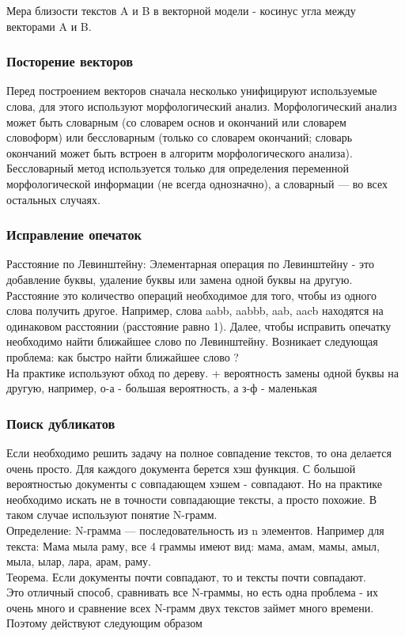 Мера близости текстов A и B в векторной модели - косинус угла между векторами A и B.

\subsubsection {Посторение векторов}
Перед построением векторов сначала несколько унифицируют используемые слова, для этого используют морфологический анализ.
Морфологический анализ может быть словарным (со словарем основ и окончаний или словарем словоформ) или бессловарным (только со словарем окончаний; словарь окончаний может быть встроен в алгоритм морфологического анализа). Бессловарный метод используется только для определения переменной морфологической информации (не всегда однозначно), а словарный — во всех остальных случаях. 

\subsubsection {Исправление опечаток}
Расстояние по Левинштейну:
Элементарная операция по Левинштейну - это добавление буквы, удаление буквы или замена одной буквы на другую. Расстояние это количество операций необходимое для того, чтобы из одного слова получить другое. Например, слова aabb, aabbb, aab, aacb находятся на одинаковом расстоянии (расстояние равно 1). Далее, чтобы исправить опечатку необходимо найти ближайшее слово по Левинштейну. 
Возникает следующая проблема: как быстро найти ближайшее слово ? \\
На практике используют обход по дереву. + вероятность замены одной буквы на другую, например, о-а - большая вероятность, а з-ф - маленькая

\subsubsection {Поиск дубликатов}
Если необходимо решить задачу на полное совпадение текстов, то она делается очень просто. Для каждого документа берется хэш функция. С большой вероятностью документы с совпадающем хэшем - совпадают. Но на практике необходимо искать не в точности совпадающие тексты, а просто похожие. В таком случае используют понятие N-грамм.  \\
Определение: N-грамма — последовательность из n элементов. Например для текста: Мама мыла раму, все 4 граммы имеют вид: мама, амам, мамы, амыл, мыла, ылар, лара, арам, раму.  \\
Теорема. Если документы почти совпадают, то и тексты почти совпадают. \\
Это отличный способ, сравнивать все N-граммы, но есть одна проблема - их очень много и сравнение всех N-грамм двух текстов займет много времени. Поэтому действуют следующим образом

